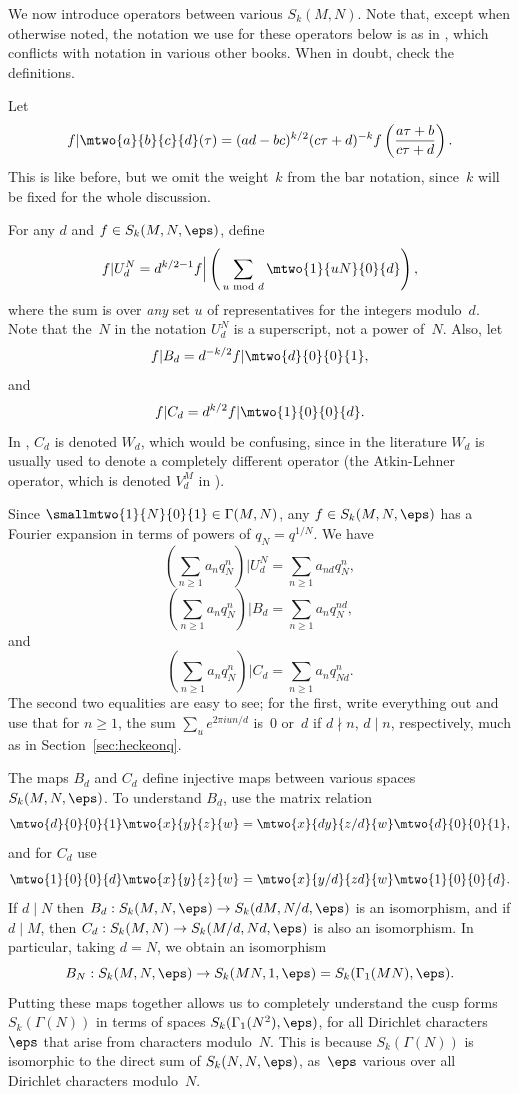 \documentclass{report}
\begin{document}
We now introduce operators between various $S_k(M,N)$.  Note that,
except when otherwise noted, the notation we use for these
operators below is as in \cite{winnie:newforms}, which conflicts
with notation in various other books.  When in doubt, check the
definitions.

Let
\[
  f|\mtwo{a}{b}{c}{d}(\tau) = (ad-bc)^{k/2} (c\tau+d)^{-k}
  f\left(\frac{a\tau+b}{c\tau+d}\right).
\]
This is like before, but we omit the weight~$k$ from the bar notation,
since~$k$ will be fixed for the whole discussion.

For any $d$ and $f\in S_k(M,N,\eps)$, define
\[
  f|U_d^N = d^{k/2-1} f \Big| \left(\,\sum_{u \text{ mod } d}
  \mtwo{1}{uN}{0}{d}\right),
\]
where the sum is over {\em any} set $u$ of representatives
for the integers modulo~$d$.
Note that the~$N$ in the notation $U_d^N$ is a superscript, not a power
of~$N$. Also, let
\[
  f|B_d = d^{-k/2} f|\mtwo{d}{0}{0}{1},
\]
and
\[
  f|C_d = d^{k/2} f|\mtwo{1}{0}{0}{d}.
\]
In \cite{winnie:newforms}, $C_d$ is denoted $W_d$, which would be confusing,
since in the literature $W_d$ is usually used to denote a completely different
operator (the Atkin-Lehner operator, which is denoted $V_d^M$ in \cite{winnie:newforms}).


Since $\smallmtwo{1}{N}{0}{1}\in\Gamma(M,N)$, any $f\in S_k(M,N,\eps)$
has a Fourier expansion in terms of powers of $q_N = q^{1/N}$. We
have
\[
   \left(\sum_{n\geq 1} a_n q_N^n\right)|U_d^N = \sum_{n\geq 1} a_{nd} q_N^n,
\]
\[
   \left(\sum_{n\geq 1} a_n q_N^n\right)|B_d = \sum_{n\geq 1} a_{n} q_N^{nd},
\]
and
\[
   \left(\sum_{n\geq 1} a_n q_N^n\right)|C_d = \sum_{n\geq 1} a_{n} q_{Nd}^{n}.
\]
The second two equalities are easy to see; for the first, write
everything out and use that for $n\geq 1$,
the sum $\sum_{u} e^{2\pi i un/d}$ is~$0$ or~$d$
if $d\nmid n$, $d\mid n$, respectively, much as
in Section~\ref{sec:heckeonq}.

The maps $B_d$ and $C_d$ define injective maps between various
spaces $S_k(M,N,\eps)$.  To understand $B_d$, use the matrix
relation
\[
  \mtwo{d}{0}{0}{1} \mtwo{x}{y}{z}{w}  = \mtwo{x}{dy}{z/d}{w}
  \mtwo{d}{0}{0}{1},
\]
and for $C_d$ use
\[
  \mtwo{1}{0}{0}{d} \mtwo{x}{y}{z}{w}  = \mtwo{x}{y/d}{zd}{w}
  \mtwo{1}{0}{0}{d}.
\]
If $d\mid N$ then $B_d:S_k(M,N,\eps)\to S_k(dM,N/d,\eps)$ is an
isomorphism, and if $d\mid M$, then $C_d:S_k(M,N)\to
S_k(M/d,Nd,\eps)$ is also an isomorphism. In particular, taking
$d=N$, we obtain an isomorphism
\begin{equation}\label{eqn:bniso}
  B_N:S_k(M,N,\eps)\to S_k(MN,1,\eps) = S_k(\Gamma_1(MN),\eps).
\end{equation}
Putting these maps together allows us to completely understand the
cusp forms $S_k(\Gamma(N))$ in terms of spaces
$S_k(\Gamma_1(N^2),\eps)$, for all Dirichlet characters $\eps$ that
arise from characters modulo~$N$.
This is because
$S_k(\Gamma(N))$ is isomorphic to the direct sum of
$S_k(N,N,\eps)$, as~$\eps$ various over all Dirichlet characters
modulo~$N$.
\end{document}
